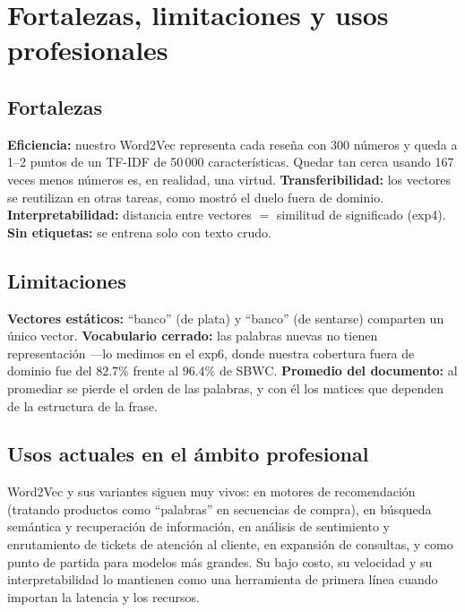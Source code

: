 \documentclass[11pt]{article}
\begin{document}
\section{Fortalezas, limitaciones y usos profesionales}

\subsection{Fortalezas}
\textbf{Eficiencia:} nuestro Word2Vec representa cada reseña con 300 números y queda a 1--2
puntos de un TF-IDF de 50\,000 características. Quedar tan cerca usando 167 veces menos números
es, en realidad, una virtud. \textbf{Transferibilidad:} los vectores se reutilizan en otras
tareas, como mostró el duelo fuera de dominio. \textbf{Interpretabilidad:} distancia entre
vectores $=$ similitud de significado (exp4). \textbf{Sin etiquetas:} se entrena solo con
texto crudo.

\subsection{Limitaciones}
\textbf{Vectores estáticos:} ``banco'' (de plata) y ``banco'' (de sentarse) comparten un único
vector. \textbf{Vocabulario cerrado:} las palabras nuevas no tienen representación ---lo
medimos en el exp6, donde nuestra cobertura fuera de dominio fue del $82.7\%$ frente al
$96.4\%$ de SBWC. \textbf{Promedio del documento:} al promediar se pierde el orden de las
palabras, y con él los matices que dependen de la estructura de la frase.

\subsection{Usos actuales en el ámbito profesional}
Word2Vec y sus variantes siguen muy vivos: en motores de recomendación (tratando productos
como ``palabras'' en secuencias de compra), en búsqueda semántica y recuperación de
información, en análisis de sentimiento y enrutamiento de tickets de atención al cliente,
en expansión de consultas, y como punto de partida para modelos más grandes. Su bajo costo,
su velocidad y su interpretabilidad lo mantienen como una herramienta de primera línea cuando
importan la latencia y los recursos.

\end{document}
